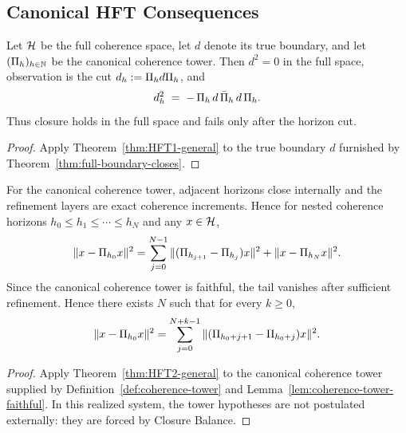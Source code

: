 \subsection{Canonical HFT Consequences}

\begin{corollary}
\label{cor:HFT1-boundary}
Let $\mathcal{H}$ be the full coherence space, let $d$ denote its true boundary, and
let $(\Pi_{h})_{h\in\mathbb{N}}$ be the canonical coherence tower. Then $d^2 = 0$ in
the full space, observation is the cut $d_{h} := \Pi_{h} d \Pi_{h}$,
and
\[
d_{h}^2 \;=\; -\,\Pi_{h}\, d \,\bar{\Pi}_{h}\, d \,\Pi_{h}.
\]
Thus closure holds in the full space and fails only after the horizon cut.
\end{corollary}

\begin{proof}
Apply Theorem~\ref{thm:HFT1-general} to the true boundary $d$ furnished by
Theorem~\ref{thm:full-boundary-closes}.
\end{proof}

\begin{corollary}
\label{thm:HFT2-canonical}
For the canonical coherence tower, adjacent horizons close internally and the
refinement layers are exact coherence increments. Hence for nested coherence
horizons $h_0 \le h_1 \le \cdots \le h_N$ and any $x\in\mathcal{H}$,
\[
\|x - \Pi_{h_0} x\|^2
=
\sum_{j=0}^{N-1} \|(\Pi_{h_{j+1}} - \Pi_{h_j})x\|^2 + \|x - \Pi_{h_N} x\|^2.
\]
Since the canonical coherence tower is faithful, the tail vanishes after
sufficient refinement. Hence there exists $N$ such that for every $k \ge 0$,
\[
\|x - \Pi_{h_0} x\|^2
=
\sum_{j=0}^{N+k-1} \|(\Pi_{h_0+j+1} - \Pi_{h_0+j})x\|^2.
\]
\end{corollary}

\begin{proof}
Apply Theorem~\ref{thm:HFT2-general} to the canonical coherence tower supplied
by Definition~\ref{def:coherence-tower} and
Lemma~\ref{lem:coherence-tower-faithful}. In this realized system, the tower
hypotheses are not postulated externally: they are forced by Closure Balance.
\end{proof}


